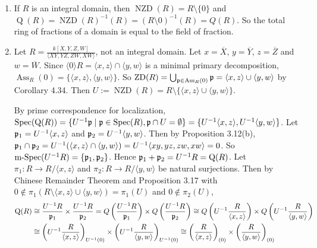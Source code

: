 \begin{example*}
    \begin{enumerate}
        \item If $R$ is an integral domain, then $\operatorname{NZD}(R) = R \setminus \{0\}$ and $\operatorname{Q}(R) = \operatorname{NZD}(R)^{-1}(R) = (R \setminus 0)^{-1}(R) = Q(R)$. So the total ring of fractions of a domain is equal to the field of fraction. 
        \item Let $R = \frac{k[X,Y,Z,W]}{\langle XY,YZ,ZW,XW \rangle}$, not an integral domain. 
            Let $x= \overbar{X}$, $y = \overbar{Y}$, $z = \overbar{Z}$ and $w = \overbar{W}$. Since $\langle 0 \rangle R = \langle x,z \rangle \cap \langle y,w \rangle$ is a minimal primary decomposition, $\operatorname{Ass}_R(0) = \{\langle x,z \rangle, \langle y, w \rangle\}$. So $\operatorname{ZD}(R) = \bigcup_{\mathfrak{p} \in \operatorname{Ass}_R(0)}\mathfrak{p} = \langle x, z\rangle \cup \langle y,w \rangle$ by Corollary 4.34. Then $U := \operatorname{NZD}(R) = R \setminus \{\langle x, z \rangle \cup \langle y, w\rangle\}$. \par 
            By prime correspondence for localization, $\operatorname{Spec}(\operatorname{Q}(R)) = \{U^{-1}\mathfrak{p} \mid \mathfrak{p} \in \operatorname{Spec}(R), \mathfrak{p} \cap U = \emptyset\} = \{U^{-1}\langle x,z \rangle, U^{-1}\langle y,w \rangle\}$. Let $\mathfrak{p}_1 = U^{-1}\langle x,z \rangle$ and $\mathfrak{p}_2 = U^{-1} \langle y,w \rangle$. Then by Proposition 3.12(b), $\mathfrak{p}_1 \cap \mathfrak{p}_2 = U^{-1}(\langle x,z \rangle \cap \langle y,w \rangle) = U^{-1} \langle xy,yz,zw,xw \rangle = 0$. So $\operatorname{m-Spec}(U^{-1}R) = \{\mathfrak{p}_1,\mathfrak{p}_2\}$. Hence $\mathfrak{p}_1 + \mathfrak{p}_2 = U^{-1}R = \operatorname{Q}(R)$. Let $\pi_1: R \to R/\langle x, z \rangle$ and $\pi_2: R \to R/\langle y, w \rangle$ be natural surjections. Then by Chinese Remainder Theorem and Proposition 3.17 with $0 \not \in \pi_1(R \setminus \langle x, z \rangle \cup \langle y,w \rangle) = \pi_1(U)$ and $0 \not \in \pi_2(U)$,
            \begin{align*}
                \operatorname{Q}(R) & \cong \frac{U^{-1}R}{\ffp_1} \times \frac{U^{-1}R}{\ffp_2} = Q\left(\frac{U^{-1}R}{\ffp_1}\right) \times Q\left(\frac{U^{-1}R}{\ffp_2}\right) \cong Q\left(U^{-1}\frac{R}{\langle x,z \rangle}\right) \times Q\left(U^{-1}\frac{R}{\langle y,w \rangle}\right) \\
                &\cong \left(U^{-1}\frac{R}{\langle x,z \rangle} \right)_{U^{-1}(0)} \times \left(U^{-1}\frac{R}{\langle y,w \rangle} \right)_{U^{-1}(0)} \cong \left(\frac{R}{\langle x,z \rangle}\right)_{(0)} \times \left(\frac{R}{\langle y,w \rangle}\right)_{(0)} \\

\end{align*}
\end{enumerate}
\end{example*}
